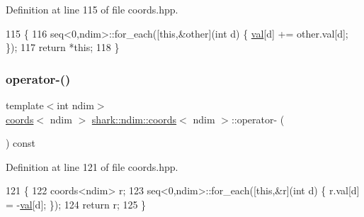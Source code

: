 Definition at line 115 of file coords.\+hpp.


\begin{DoxyCode}
115                                                                                \{
116             seq<0,ndim>::for\_each([\textcolor{keyword}{this},&other](\textcolor{keywordtype}{int} d) \{ \hyperlink{structshark_1_1ndim_1_1coords_a425262af388367b0f0079218e038aef5}{val}[d] += other.val[d]; \});
117             \textcolor{keywordflow}{return} *\textcolor{keyword}{this};
118         \}
\end{DoxyCode}
\hypertarget{structshark_1_1ndim_1_1coords_a013d9ad7f7c14ba57c5d08846019d6ad}{}\label{structshark_1_1ndim_1_1coords_a013d9ad7f7c14ba57c5d08846019d6ad} 
\subsubsection{\texorpdfstring{operator-\/()}{operator-()}\hspace{0.1cm}{\footnotesize\ttfamily [1/2]}}
{\footnotesize\ttfamily template$<$int ndim$>$ \\
\hyperlink{structshark_1_1ndim_1_1coords}{coords}$<$ ndim $>$ \hyperlink{structshark_1_1ndim_1_1coords}{shark\+::ndim\+::coords}$<$ ndim $>$\+::operator-\/ (\begin{DoxyParamCaption}{ }\end{DoxyParamCaption}) const\hspace{0.3cm}{\ttfamily [inline]}}



Definition at line 121 of file coords.\+hpp.


\begin{DoxyCode}
121                                                           \{
122             coords<ndim> r;
123             seq<0,ndim>::for\_each([\textcolor{keyword}{this},&r](\textcolor{keywordtype}{int} d) \{ r.val[d] = -\hyperlink{structshark_1_1ndim_1_1coords_a425262af388367b0f0079218e038aef5}{val}[d]; \});
124             \textcolor{keywordflow}{return} r;
125         \}
\end{DoxyCode}
\hypertarget{structshark_1_1ndim_1_1coords_a642618334175f93887e2b1cfab694c6b}{}\label{structshark_1_1ndim_1_1coords_a642618334175f93887e2b1cfab694c6b} 
